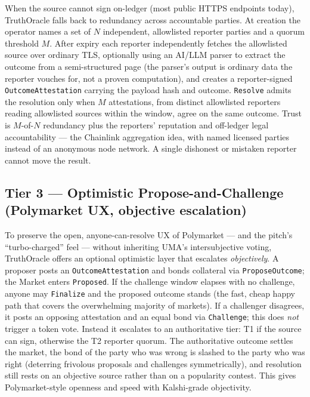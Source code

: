 \documentclass[11pt,a4paper]{article}
\begin{document}
When the source cannot sign on-ledger (most public HTTPS endpoints today), TruthOracle falls back to redundancy across accountable parties. At creation the operator names a set of $N$ independent, allowlisted reporter parties and a quorum threshold $M$. After expiry each reporter independently fetches the allowlisted source over ordinary TLS, optionally using an AI/LLM parser to extract the outcome from a semi-structured page (the parser's output is ordinary data the reporter vouches for, not a proven computation), and creates a reporter-signed \texttt{OutcomeAttestation} carrying the payload hash and outcome. \texttt{Resolve} admits the resolution only when $M$ attestations, from distinct allowlisted reporters reading allowlisted sources within the window, agree on the same outcome. Trust is $M$-of-$N$ redundancy plus the reporters' reputation and off-ledger legal accountability --- the Chainlink aggregation idea, with named licensed parties instead of an anonymous node network. A single dishonest or mistaken reporter cannot move the result.

\subsection{Tier 3 --- Optimistic Propose-and-Challenge (Polymarket UX, objective escalation)}

\begin{sloppypar}
To preserve the open, anyone-can-resolve UX of Polymarket --- and the pitch's ``turbo-charged'' feel --- without inheriting UMA's intersubjective voting, TruthOracle offers an optional optimistic layer that escalates \emph{objectively}. A proposer posts an \texttt{OutcomeAttestation} and bonds collateral via \texttt{ProposeOutcome}; the Market enters \texttt{Proposed}. If the challenge window elapses with no challenge, anyone may \texttt{Finalize} and the proposed outcome stands (the fast, cheap happy path that covers the overwhelming majority of markets). If a challenger disagrees, it posts an opposing attestation and an equal bond via \texttt{Challenge}; this does \emph{not} trigger a token vote. Instead it escalates to an authoritative tier: T1 if the source can sign, otherwise the T2 reporter quorum. The authoritative outcome settles the market, the bond of the party who was wrong is slashed to the party who was right (deterring frivolous proposals and challenges symmetrically), and resolution still rests on an objective source rather than on a popularity contest. This gives Polymarket-style openness and speed with Kalshi-grade objectivity.
\end{sloppypar}
\end{document}
